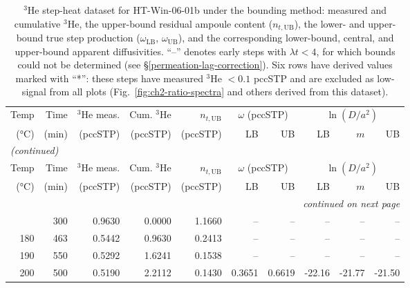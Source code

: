 {\let\scriptsize\normalsize
\begin{landscape}
\setlength{\tabcolsep}{5pt}
\begin{longtable}{r r r r r r r r r r}
\caption{$^3$He step-heat dataset for HT-Win-06-01b under the bounding method: measured and cumulative $^3$He, the upper-bound residual ampoule content ($n_{t,\mathrm{UB}}$), the lower- and upper-bound true step production ($\omega_{\mathrm{LB}}$, $\omega_{\mathrm{UB}}$), and the corresponding lower-bound, central, and upper-bound apparent diffusivities. ``--'' denotes early steps with $\lambda t < 4$, for which bounds could not be determined (see \S\ref{permeation-lag-correction}). Six rows have derived values marked with ``*'': these steps have measured $^3$He $<0.1$ pccSTP and are excluded as low-signal from all plots (Fig.~\ref{fig:ch2-ratio-spectra} and others derived from this dataset).}\label{tab:ch2-distilled-3he}\\
\toprule
Temp & Time & $^3$He meas. & Cum. $^3$He & $n_{t,\mathrm{UB}}$ & \multicolumn{2}{c}{$\omega$ (pccSTP)} & \multicolumn{3}{c}{$\ln(D/a^2)$} \\
\cmidrule(lr){6-7}\cmidrule(lr){8-10}
(°C) & (min) & (pccSTP) & (pccSTP) & (pccSTP) & LB & UB & LB & $m$ & UB \\
\midrule
\endfirsthead
\multicolumn{10}{l}{\textit{(continued)}} \\
\toprule
Temp & Time & $^3$He meas. & Cum. $^3$He & $n_{t,\mathrm{UB}}$ & \multicolumn{2}{c}{$\omega$ (pccSTP)} & \multicolumn{3}{c}{$\ln(D/a^2)$} \\
\cmidrule(lr){6-7}\cmidrule(lr){8-10}
(°C) & (min) & (pccSTP) & (pccSTP) & (pccSTP) & LB & UB & LB & $m$ & UB \\
\midrule
\endhead
\midrule
\multicolumn{10}{r}{\textit{continued on next page}} \\
\endfoot
\bottomrule
\endlastfoot
170 & 300 & 0.9630 & 0.0000 & 1.1660 & -- & -- & -- & -- & -- \\
180 & 463 & 0.5442 & 0.9630 & 0.2413 & -- & -- & -- & -- & -- \\
190 & 550 & 0.5292 & 1.6241 & 0.1538 & -- & -- & -- & -- & -- \\
200 & 500 & 0.5190 & 2.2112 & 0.1430 & 0.3651 & 0.6619 & -22.16 & -21.77 & -21.50 \\

\end{longtable}
\end{landscape}}
